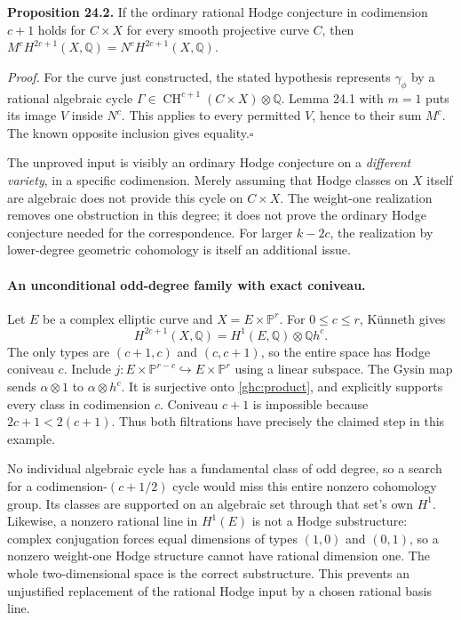 \documentclass[11pt]{article}
\begin{document}
\textbf{Proposition 24.2.}
If the ordinary rational Hodge conjecture in codimension $c+1$ holds
 for $C\times X$ for every smooth projective curve $C$, then
 $M^cH^{2c+1}(X,\mathbb Q)=N^cH^{2c+1}(X,\mathbb Q)$.

\emph{Proof.}
For the curve just constructed, the stated hypothesis represents
 $\gamma_\phi$ by a rational algebraic cycle
 $\Gamma\in\operatorname{CH}^{c+1}(C\times X)\otimes\mathbb Q$.
 Lemma 24.1 with $m=1$ puts its image $V$ inside $N^c$.
 This applies to every permitted $V$, hence to their sum $M^c$.
 The known opposite inclusion gives equality.\hfill$\square$

The unproved input is visibly an ordinary Hodge conjecture on a
 \emph{different variety}, in a specific codimension. Merely assuming
 that Hodge classes on $X$ itself are algebraic does not provide this
 cycle on $C\times X$. The weight-one realization removes one obstruction
 in this degree; it does not prove the ordinary Hodge conjecture needed
 for the correspondence. For larger $k-2c$, the realization by lower-degree
 geometric cohomology is itself an additional issue.

\paragraph{An unconditional odd-degree family with exact coniveau.}
Let $E$ be a complex elliptic curve and $X=E\times\mathbb P^r$.
 For $0\leq c\leq r$, K\"unneth gives
\begin{equation}\label{ghc:product}
 H^{2c+1}(X,\mathbb Q)=H^1(E,\mathbb Q)\otimes\mathbb Q h^c.
\end{equation}
The only types are $(c+1,c)$ and $(c,c+1)$, so the entire space has
 Hodge coniveau $c$. Include
 $j:E\times\mathbb P^{r-c}\hookrightarrow E\times\mathbb P^r$
 using a linear subspace. The Gysin map sends
 $\alpha\otimes1$ to $\alpha\otimes h^c$. It is surjective onto
 \eqref{ghc:product}, and explicitly supports every class in codimension
 $c$. Coniveau $c+1$ is impossible because $2c+1<2(c+1)$.
 Thus both filtrations have precisely the claimed step in this example.

No individual algebraic cycle has a fundamental class of odd degree,
 so a search for a codimension-$(c+1/2)$ cycle would miss this entire
 nonzero cohomology group. Its classes are supported on an algebraic
 set through that set's own $H^1$. Likewise, a nonzero rational line in
 $H^1(E)$ is not a Hodge substructure: complex conjugation forces equal
 dimensions of types $(1,0)$ and $(0,1)$, so a nonzero weight-one Hodge
 structure cannot have rational dimension one. The whole two-dimensional
 space is the correct substructure. This prevents an unjustified
 replacement of the rational Hodge input by a chosen rational basis line.
\end{document}
